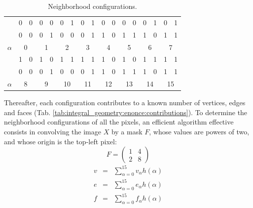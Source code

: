 \vspace*{-8pt}
\begin{table}[H]
\caption{Neighborhood configurations.}%
\centering
\begin{tabular}{|l|ll|ll|ll|ll|ll|ll|ll|ll|}
\hline
 & 0 & 0 & 0 & 0 & 0 & 1 & 0 & 1 & 0 & 0 & 0 & 0 & 0 & 1 & 0 & 1\\
 & 0 & 0 & 0 & 1 & 0 & 0 & 0 & 1 & 1 & 0 & 1 & 1 & 1 & 0 & 1 & 1\\ \hline
$\alpha$ & \multicolumn{2}{c|}{0} & \multicolumn{2}{c|}{1} & \multicolumn{2}{c|}{2} & \multicolumn{2}{c|}{3} & \multicolumn{2}{c|}{4} & \multicolumn{2}{c|}{5} & \multicolumn{2}{c|}{6} & \multicolumn{2}{c|}{7}\\ \hline\hline
 & 1 & 0 & 1 & 0 & 1 & 1 & 1 & 1 & 1 & 0 & 1 & 0 & 1 & 1 & 1 & 1\\
 & 0 & 0 & 0 & 1 & 0 & 0 & 0 & 1 & 1 & 0 & 1 & 1 & 1 & 0 & 1 & 1\\ \hline
$\alpha$ & \multicolumn{2}{c|}{8} & \multicolumn{2}{c|}{9} & \multicolumn{2}{c|}{10} & \multicolumn{2}{c|}{11} & \multicolumn{2}{c|}{12} & \multicolumn{2}{c|}{13} & \multicolumn{2}{c|}{14} & \multicolumn{2}{c|}{15} \\
\hline
\end{tabular}
\label{tab:integral_geometry:enonce:neighborhoods}%
\end{table}
\vspace*{-8pt}

Thereafter, each configuration contributes to a known number of vertices, edges and faces (Tab. \ref{tab:integral_geometry:enonce:contributions}). To determine the neighborhood configurations of all the pixels, an efficient algorithm effective consists in convolving the image $X$ by a mask $F$, whose values are powers of two, and whose origin is the top-left pixel:\vspace*{-5pt}
$$
F=\left(
\begin{array}{cc}
1 & 4\\
2 & 8
\end{array}
\right)
$$
\vspace*{-5pt}
\begin{eqnarray}
v&=&\sum_{\alpha=0}^{15}v_{\alpha}h(\alpha)\\
e&=&\sum_{\alpha=0}^{15}e_{\alpha}h(\alpha)\\
f&=&\sum_{\alpha=0}^{15}f_{\alpha}h(\alpha)
\end{eqnarray}


